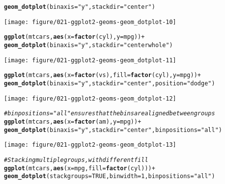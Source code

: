 \documentclass[a4paper,titlepage]{tufte-handout}\usepackage[]{graphicx}\usepackage[]{color}
\makeatletter
\def\maxwidth{ %
  \ifdim\Gin@nat@width>\linewidth
    \linewidth
  \else
    \Gin@nat@width
  \fi
}
\newcommand{\hlnum}[1]{\textcolor[rgb]{0.686,0.059,0.569}{#1}}%
\newcommand{\hlstr}[1]{\textcolor[rgb]{0.192,0.494,0.8}{#1}}%
\newcommand{\hlcom}[1]{\textcolor[rgb]{0.678,0.584,0.686}{\textit{#1}}}%
\newcommand{\hlopt}[1]{\textcolor[rgb]{0,0,0}{#1}}%
\newcommand{\hlstd}[1]{\textcolor[rgb]{0.345,0.345,0.345}{#1}}%
\newcommand{\hlkwc}[1]{\textcolor[rgb]{0.333,0.667,0.333}{#1}}%
\newcommand{\hlkwd}[1]{\textcolor[rgb]{0.737,0.353,0.396}{\textbf{#1}}}%
\newenvironment{kframe}{%
 \def\at@end@of@kframe{}%
 \ifinner\ifhmode%
  \def\at@end@of@kframe{\end{minipage}}%
  \begin{minipage}{\columnwidth}%
 \fi\fi%
 \def\FrameCommand##1{\hskip\@totalleftmargin \hskip-\fboxsep
 \colorbox{shadecolor}{##1}\hskip-\fboxsep
     \hskip-\linewidth \hskip-\@totalleftmargin \hskip\columnwidth}%
 \MakeFramed {\advance\hsize-\width
   \@totalleftmargin\z@ \linewidth\hsize
   \@setminipage}}%
 {\par\unskip\endMakeFramed%
 \at@end@of@kframe}
\newenvironment{knitrout}{}{} %
\makeatother
\begin{document}
\begin{knitrout}
\begin{kframe}
\begin{alltt}
  \hlkwd{geom_dotplot}\hlstd{(}\hlkwc{binaxis} \hlstd{=} \hlstr{"y"}\hlstd{,} \hlkwc{stackdir} \hlstd{=} \hlstr{"center"}\hlstd{)}
\end{alltt}
\end{kframe}
\texttt{[image: figure/021-ggplot2-geoms-geom\_dotplot-10]} 
\begin{kframe}\begin{alltt}
\hlkwd{ggplot}\hlstd{(mtcars,} \hlkwd{aes}\hlstd{(}\hlkwc{x} \hlstd{=} \hlkwd{factor}\hlstd{(cyl),} \hlkwc{y} \hlstd{= mpg))} \hlopt{+}
  \hlkwd{geom_dotplot}\hlstd{(}\hlkwc{binaxis} \hlstd{=} \hlstr{"y"}\hlstd{,} \hlkwc{stackdir} \hlstd{=} \hlstr{"centerwhole"}\hlstd{)}
\end{alltt}
\end{kframe}
\texttt{[image: figure/021-ggplot2-geoms-geom\_dotplot-11]} 
\begin{kframe}\begin{alltt}
\hlkwd{ggplot}\hlstd{(mtcars,} \hlkwd{aes}\hlstd{(}\hlkwc{x} \hlstd{=} \hlkwd{factor}\hlstd{(vs),} \hlkwc{fill} \hlstd{=} \hlkwd{factor}\hlstd{(cyl),} \hlkwc{y} \hlstd{= mpg))} \hlopt{+}
  \hlkwd{geom_dotplot}\hlstd{(}\hlkwc{binaxis} \hlstd{=} \hlstr{"y"}\hlstd{,} \hlkwc{stackdir} \hlstd{=} \hlstr{"center"}\hlstd{,} \hlkwc{position} \hlstd{=} \hlstr{"dodge"}\hlstd{)}
\end{alltt}
\end{kframe}
\texttt{[image: figure/021-ggplot2-geoms-geom\_dotplot-12]} 
\begin{kframe}\begin{alltt}
\hlcom{# binpositions="all" ensures that the bins are aligned between groups}
\hlkwd{ggplot}\hlstd{(mtcars,} \hlkwd{aes}\hlstd{(}\hlkwc{x} \hlstd{=} \hlkwd{factor}\hlstd{(am),} \hlkwc{y} \hlstd{= mpg))} \hlopt{+}
  \hlkwd{geom_dotplot}\hlstd{(}\hlkwc{binaxis} \hlstd{=} \hlstr{"y"}\hlstd{,} \hlkwc{stackdir} \hlstd{=} \hlstr{"center"}\hlstd{,} \hlkwc{binpositions}\hlstd{=}\hlstr{"all"}\hlstd{)}
\end{alltt}
\end{kframe}
\texttt{[image: figure/021-ggplot2-geoms-geom\_dotplot-13]} 
\begin{kframe}\begin{alltt}
\hlcom{# Stacking multiple groups, with different fill}
\hlkwd{ggplot}\hlstd{(mtcars,} \hlkwd{aes}\hlstd{(}\hlkwc{x} \hlstd{= mpg,} \hlkwc{fill} \hlstd{=} \hlkwd{factor}\hlstd{(cyl)))} \hlopt{+}
  \hlkwd{geom_dotplot}\hlstd{(}\hlkwc{stackgroups} \hlstd{=} \hlnum{TRUE}\hlstd{,} \hlkwc{binwidth} \hlstd{=} \hlnum{1}\hlstd{,} \hlkwc{binpositions} \hlstd{=} \hlstr{"all"}\hlstd{)}

\end{alltt}
\end{kframe}
\end{knitrout}
\end{document}
